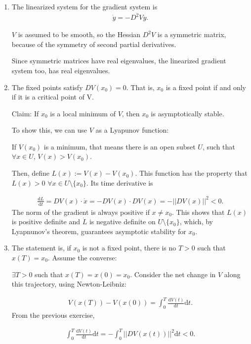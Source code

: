 \begin{solution}[8.6]
	\begin{enumerate}
		\item The linearized system for the gradient system is 
\begin{align}
\dot{y} = -D^2Vy.
\end{align}

$V$ is assumed to be smooth, so the Hessian $D^2V$ is a symmetric matrix, because of the symmetry of second partial derivatives. 

Since symmetric matrices have real eigenvalues, the linearized gradient system too, has real eigenvalues.

\item The fixed points satisfy $DV(x_0) = 0$.
That is, $x_0$ is a fixed point if and only if it is a critical point of V. 

Claim: If $x_0$ is a local minimum of $V$, then $x_0$ is asymptotically stable.

To show this, we can use $V$ as a Lyapunov function:

If $V(x_0)$ is a minimum, that means there is an open subset $U$, such that 
$\forall x\in U$, $V(x)>V(x_0)$.

Then, define $L(x):= V(x)-V(x_0)$. This function has the property that $L(x)>0$ $\forall x\in U\setminus \{x_0\}$. Its time derivative is

\begin{align}
\frac{\text{d}L}{\text{d}t} = DV(x)\cdot \dot{x} = -DV(x)\cdot DV(x) = - ||DV(x)||^2 < 0.
\end{align}
The norm of the gradient is always positive if $x\ne x_0$. 
This shows that $L(x)$ is positive definite and $\dot{L}$ is negative definite  on $U\setminus \{x_0\}$, which, by Lyapnunov's theorem, guarantees asymptotic stability for $x_0$.

\item The statement is, if $x_0$ is not a fixed point, there is no $T>0$ such that $x(T) = x_0$. Assume the converse: 

$\exists T>0$ such that $x(T)=x(0)=x_0$. Consider the net change in $V$ along this trajectory, using Newton-Leibniz:

\begin{align}
    V(x(T)) - V(x(0)) = \int_0^T \frac{\text{d}V(t)}{\text{d}t} \text{d}t. \label{nl}
\end{align}
From the previous exercise, 

\begin{align}
    \int_0^T \frac{\text{d}V(t)}{\text{d}t} \text{d}t = -\int_0^T ||DV(x(t))||^2 \text{d}t < 0. \label{n2}
\end{align}


\end{enumerate}
\end{solution}
